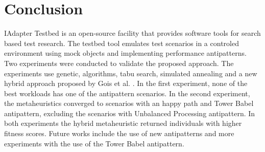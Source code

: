 \vspace*{-.075in}
\section{Conclusion}
\vspace*{-.075in}

IAdapter Testbed is an open-source facility that provides software tools for search based test research. The testbed tool emulates test scenarios in a controled environment using mock objects and implementing performance antipatterns.  Two experiments were conducted to validate the proposed approach. The experiments use genetic, algorithms, tabu search, simulated annealing and a new hybrid approach proposed by Gois et al. \cite{Gois2016}. In the first experiment, none of the best workloads has one of the antipattern scenarios. In the second experiment,  the metaheuristics converged to scenarios with an happy path and Tower Babel antipattern, excluding the scenarios with Unbalanced Processing antipattern. In both experiments the hybrid metaheuristic returned individuals with higher fitness scores. Future works include the use of new antipatterns and more experiments with the use of the Tower Babel antipattern.
